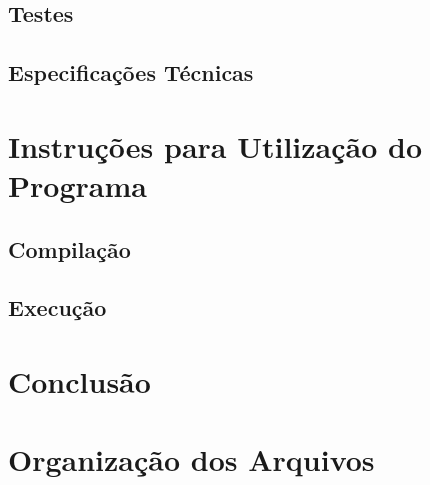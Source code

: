\documentclass[10pt]{article}
\begin{document}
\subsection{Testes}
\subsection{Especificações Técnicas}


\section{Instruções para Utilização do Programa}
\subsection{Compilação}
\subsection{Execução}


\section{Conclusão}


\appendix
\section{Organização dos Arquivos}
\end{document}
